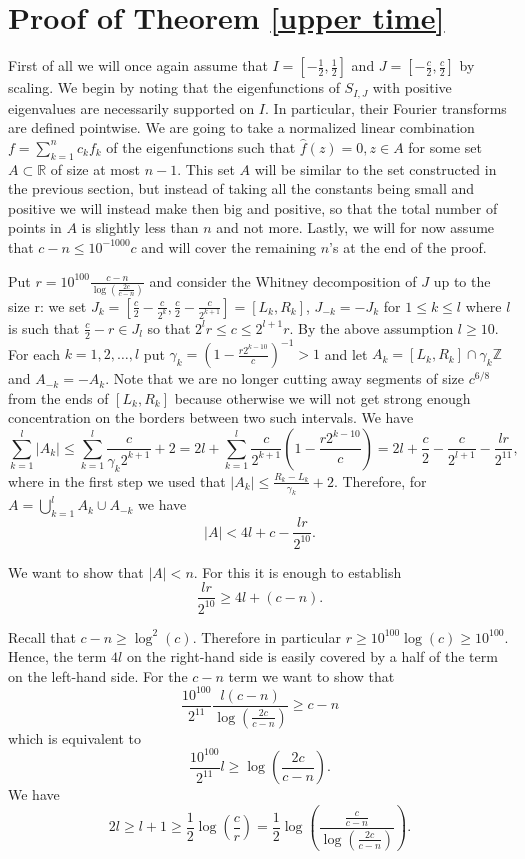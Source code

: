 \documentclass[12pt]{amsart}
\numberwithin{equation}{section}
\newcommand{\Z}{\mathbb{Z}}
\newcommand{\R}{\mathbb{R}}
\begin{document}
\section{Proof of Theorem \ref{upper time}}\label{UT}
First of all we will once again assume that $I = [-\frac{1}{2},\frac{1}{2}]$ and $J = [-\frac{c}{2},\frac{c}{2}]$ by scaling. We begin by noting that the eigenfunctions of $S_{I,J}$ with positive eigenvalues are necessarily supported on $I$. In particular, their Fourier transforms are defined pointwise. We are going to take a normalized linear combination $f=\sum_{k=1}^n c_k f_k$ of the eigenfunctions such that $\hat{f}(z) = 0, z\in A$ for some set $A\subset \R$ of size at most $n-1$. This set $A$ will be similar to the set constructed in the previous section, but instead of taking all the constants being small and positive we will instead make then big and positive, so that the total number of points in $A$ is slightly less than $n$ and not more. Lastly, we will for now assume that $c-n \le 10^{-1000}c$ and will cover the remaining $n$'s at the end of the proof.

Put $r = 10^{100}\frac{c-n}{\log(\frac{2c}{c-n})}$ and consider the Whitney decomposition of $J$ up to the size r:  we set $J_k = [\frac{c}{2}-\frac{c}{2^{k}},\frac{c}{2}-\frac{c}{2^{k+1}}] = [L_k, R_k]$, $J_{-k} =-J_k$ for $1\le k\le l$ where $l$ is such that $\frac{c}{2}-r\in J_l$ so that $2^{l}r \le c \le 2^{l+1}r$. By the above assumption $l\ge 10$. For each $k = 1, 2,\ldots , l$ put $\gamma_k = \left(1-\frac{r2^{k-10}}{c}\right)^{-1}>1$ and let $A_k = [L_k, R_k]\cap \gamma_k\Z$ and $A_{-k} = -A_k$. Note that we are no longer cutting away segments of size $c^{6/8}$ from the ends of $[L_k,R_k]$ because otherwise we will not get strong enough concentration on the borders between two such intervals. We have
$$\sum_{k=1}^l |A_k| \le \sum_{k=1}^l \frac{c}{\gamma_k 2^{k+1}} + 2 = 2l + \sum_{k=1}^l \frac{c}{2^{k+1}}\left(1-\frac{r2^{k-10}}{c}\right) = 2l+\frac{c}{2} - \frac{c}{2^{l+1}}-\frac{lr}{2^{11}},$$
where in the first step we used that $|A_k| \le \frac{R_k-L_k}{\gamma_k}+2$. Therefore, for $A = \bigcup_{k=1}^l A_k\cup A_{-k}$ we have
$$|A| < 4l + c - \frac{lr}{2^{10}}.$$

We want to show that $|A| < n$. For this it is enough to establish
$$\frac{lr}{2^{10}}\ge 4l + (c-n).$$

Recall that $c-n \ge \log^2(c)$. Therefore in particular $r \ge 10^{100} \log(c)\ge 10^{100}$. Hence, the term $4l$ on the right-hand side is easily covered by a half of the term on the left-hand side. For the $c-n$ term we want to show that
$$\frac{10^{100}}{2^{11}}\frac{l(c-n)}{\log(\frac{2c}{c-n})}\ge c-n$$
which is equivalent to
$$\frac{10^{100}}{2^{11}}l \ge \log\left(\frac{2c}{c-n}\right).$$
We have $$2l\ge l +1 \ge \frac{1}{2}\log\left(\frac{c}{r}\right) = \frac{1}{2}\log\left(\frac{\frac{c}{c-n}}{\log(\frac{2c}{c-n})}\right).$$
\end{document}
